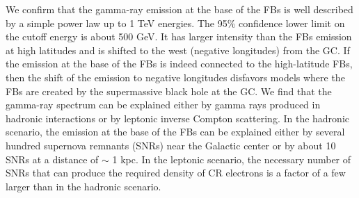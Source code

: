 \documentclass[preprint]{aa}
\begin{document}
{We confirm that the gamma-ray emission at the base of the FBs is well described by a simple power law up to 1 TeV energies.
The 95\% confidence lower limit on the cutoff energy is about 500 GeV.
It has larger intensity than the FBs emission at high latitudes and is shifted to the west (negative longitudes) from the GC.
If the emission at the base of the FBs is indeed connected to the high-latitude FBs, 
then the shift of the emission to negative longitudes disfavors models where the FBs are created by
the supermassive black hole at the GC.
We find that the gamma-ray spectrum can be explained either by gamma rays produced in hadronic interactions or by 
leptonic inverse Compton scattering.
In the hadronic scenario, the emission at the base of the FBs can be explained either by several hundred supernova remnants (SNRs) near the Galactic center
or by about 10 SNRs at a distance of $\sim$ 1 kpc.
In the leptonic scenario, the necessary number of SNRs that can produce the required density of CR electrons
is a factor of a few larger than in the hadronic scenario.
}
{}


\maketitle
   
   








\newpage
  

\begin{appendix}



%
\end{appendix}
\end{document}
